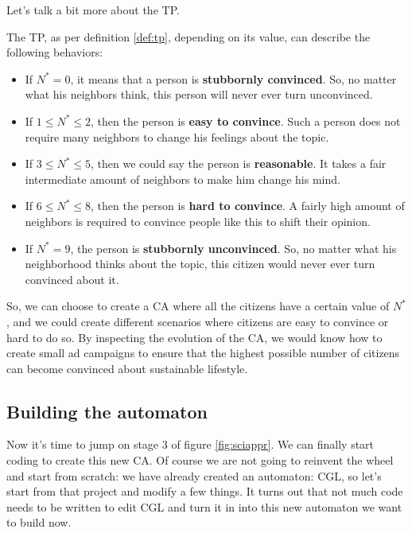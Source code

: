 Let's talk a bit more about the TP.

\begin{proposition}
The TP, as per definition \ref{def:tp},
depending on its value, can describe the following behaviors:
\begin{itemize}
\item If $N^\ast = 0$, it means that a person is \textbf{stubbornly convinced}. So, no matter what his
neighbors think, this person will never ever turn unconvinced.
\item If $1 \leq N^\ast \leq 2$, then the person is \textbf{easy to convince}. Such a person does not
require many neighbors to change his feelings about the topic.
\item If $3 \leq N^\ast \leq 5$, then we could say the person is \textbf{reasonable}. It takes a fair
intermediate amount of neighbors to make him change his mind.
\item If $6 \leq N^\ast \leq 8$, then the person is \textbf{hard to convince}. A fairly high amount of
neighbors is required to convince people like this to shift their opinion.
\item If $N^\ast = 9$, the person is \textbf{stubbornly unconvinced}. So, no matter what his
neighborhood thinks about the topic, this citizen would never ever turn convinced about it.
\end{itemize}
\end{proposition}

So, we can choose to create a CA where all the citizens have a certain value of $N^\ast$, and
we could create different scenarios where citizens are easy to convince or hard to do so.
By inspecting the evolution of the CA, we would know how to create small ad campaigns to ensure
that the highest possible number of citizens can become convinced about sustainable lifestyle.

\subsection{Building the automaton}
Now it's time to jump on stage 3 of figure \ref{fig:sciappr}. We can finally start coding to
create this new CA. Of course we are not going to reinvent the wheel and start from scratch: we
have already created an automaton: CGL, so let's start from that project and modify a few things.
It turns out that not much code needs to be written to edit CGL and turn it in into this new
automaton we want to build now.

